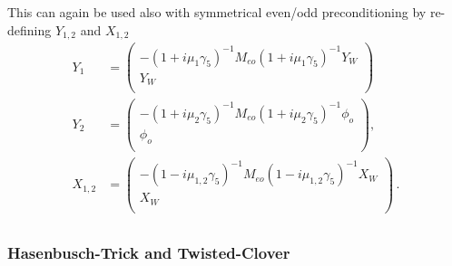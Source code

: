 This can again be used also with symmetrical even/odd preconditioning
by re-defining $Y_{1,2}$ and $X_{1,2}$
\begin{equation}
  \label{eq:mt9}
  \begin{split}
    Y_1 &= 
    \begin{pmatrix}
      -(1+i\mu_{1}\gamma_5)^{-1}M_{eo}(1+i\mu_{1}\gamma_5)^{-1}Y_W \\ Y_W\\
    \end{pmatrix}\, \\
    Y_2 &= 
    \begin{pmatrix}
      -(1+i\mu_{2}\gamma_5)^{-1}M_{eo}(1+i\mu_{2}\gamma_5)^{-1}\phi_o \\ \phi_o\\
    \end{pmatrix},\\
    X_{1,2} &= 
    \begin{pmatrix}
      -(1-i\mu_{1,2}\gamma_5)^{-1}M_{eo}(1-i\mu_{1,2}\gamma_5)^{-1}X_W \\ X_W\\
    \end{pmatrix}\, .\\
  \end{split}
\end{equation}

\subsubsection{Hasenbusch-Trick and Twisted-Clover}

